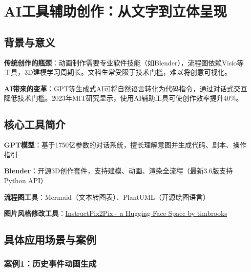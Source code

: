 \hypertarget{aiux5de5ux5177ux8f85ux52a9ux521bux4f5cux4eceux6587ux5b57ux5230ux7acbux4f53ux5448ux73b0}{%
\section{AI工具辅助创作：从文字到立体呈现}\label{aiux5de5ux5177ux8f85ux52a9ux521bux4f5cux4eceux6587ux5b57ux5230ux7acbux4f53ux5448ux73b0}}

\hypertarget{ux80ccux666fux4e0eux610fux4e49}{%
\subsection{背景与意义}\label{ux80ccux666fux4e0eux610fux4e49}}

\textbf{传统创作的瓶颈}：动画制作需要专业软件技能（如Blender），流程图依赖Visio等工具，3D建模学习周期长。文科生常受限于技术门槛，难以将创意可视化。

\textbf{AI带来的变革}：GPT等生成式AI可将自然语言转化为代码指令，通过对话式交互降低技术门槛。2023年MIT研究显示，使用AI辅助工具可使创作效率提升40\%。



\hypertarget{ux6838ux5fc3ux5de5ux5177ux7b80ux4ecb}{%
\subsection{核心工具简介}\label{ux6838ux5fc3ux5de5ux5177ux7b80ux4ecb}}

\textbf{GPT模型}：基于1750亿参数的对话系统，擅长理解意图并生成代码、剧本、操作指引

\textbf{Blender}：开源3D创作套件，支持建模、动画、渲染全流程（最新3.6版支持Python
API）

\textbf{流程图工具}：Mermaid（文本转图表）、PlantUML（开源绘图语言）

\textbf{图片风格修改工具}：\href{https://huggingface.co/spaces/timbrooks/instruct-pix2pix}{InstructPix2Pix
- a Hugging Face Space by timbrooks}



\hypertarget{ux5177ux4f53ux5e94ux7528ux573aux666fux4e0eux6848ux4f8b}{%
\subsection{具体应用场景与案例}\label{ux5177ux4f53ux5e94ux7528ux573aux666fux4e0eux6848ux4f8b}}

\hypertarget{ux6848ux4f8b1ux5386ux53f2ux4e8bux4ef6ux52a8ux753bux751fux6210}{%
\subsubsection{案例1：历史事件动画生成}\label{ux6848ux4f8b1ux5386ux53f2ux4e8bux4ef6ux52a8ux753bux751fux6210}}

